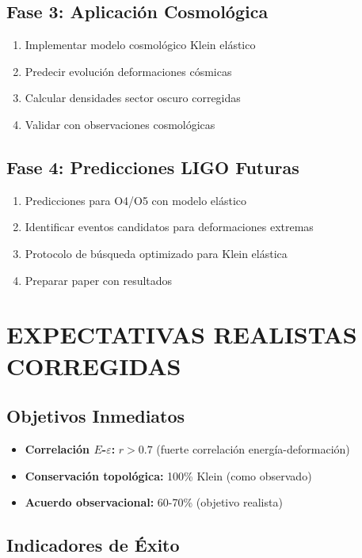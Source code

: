\documentclass[12pt,a4paper]{article}
\begin{document}
\subsection{Fase 3: Aplicación Cosmológica}

\begin{enumerate}
\item Implementar modelo cosmológico Klein elástico
\item Predecir evolución deformaciones cósmicas
\item Calcular densidades sector oscuro corregidas
\item Validar con observaciones cosmológicas
\end{enumerate}

\subsection{Fase 4: Predicciones LIGO Futuras}

\begin{enumerate}
\item Predicciones para O4/O5 con modelo elástico
\item Identificar eventos candidatos para deformaciones extremas
\item Protocolo de búsqueda optimizado para Klein elástica
\item Preparar paper con resultados
\end{enumerate}

\section{EXPECTATIVAS REALISTAS CORREGIDAS}

\subsection{Objetivos Inmediatos}

\begin{itemize}
\item \textbf{Correlación $E$-$\varepsilon$:} $r > 0.7$ (fuerte correlación energía-deformación)
\item \textbf{Conservación topológica:} 100\% Klein (como observado)
\item \textbf{Acuerdo observacional:} 60-70\% (objetivo realista)
\end{itemize}

\subsection{Indicadores de Éxito}
\end{document}
